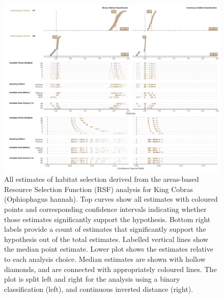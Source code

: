 \documentclass[10pt,a4paper]{article}
\begin{document}
\begin{figure}
\includegraphics[width=1\linewidth]{../../figures/specCurve_Ophiophagus hannah_rsf} \caption{All estimates of habitat selection derived from the areas-based Resource Selection Function (RSF) analysis for King Cobras (Ophiophagus hannah). Top curves show all estimates with coloured points and corresponding confidence intervals indicating whether those estimates significantly support the hypothesis. Bottom right labels provide a count of estimates that significantly support the hypothesis out of the total estimates. Labelled vertical lines show the median point estimate. Lower plot shows the estimates relative to each analysis choice. Median estimates are shown with hollow diamonds, and are connected with appropriately coloured lines. The plot is split left and right for the analysis using a binary classification (left), and continuous inverted distance (right).}\label{fig:specCurveRsfOPHA}
\end{figure}
\end{document}
